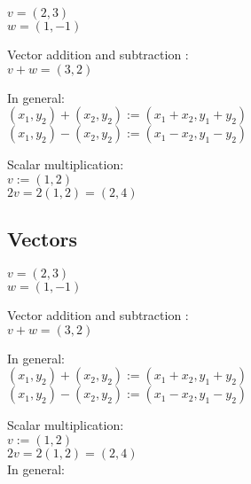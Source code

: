 \documentclass[twocolumn,20pt,fleqn]{extarticle}
\newcommand{\sep}{\vspace{0.5cm}}
\theoremstyle{plain}
\theoremstyle{definition}
\theoremstyle{remark}
\begin{document}
\newpage

$v=(2,3)$\\
$w=(1,-1)$

\sep
Vector addition  and subtraction :\\
$v+w = (3,2)$



In general:\\
$(x_1,y_2) + (x_2,y_2) := (x_1 + x_2, y_1 + y_2)$\\
$(x_1,y_2) - (x_2,y_2) := (x_1 - x_2, y_1 - y_2)$




\sep
Scalar multiplication:\\
 $v:=(1,2)$\\
 $2v=2(1,2)=(2,4)$\\










\clearpage



\subsection{Vectors}

\newpage

$v=(2,3)$\\
$w=(1,-1)$

\sep
Vector addition  and subtraction :\\
$v+w = (3,2)$



In general:\\
$(x_1,y_2) + (x_2,y_2) := (x_1 + x_2, y_1 + y_2)$\\
$(x_1,y_2) - (x_2,y_2) := (x_1 - x_2, y_1 - y_2)$




\sep
Scalar multiplication:\\
 $v:=(1,2)$\\
 $2v=2(1,2)=(2,4)$\\
In general:\\
\end{document}
